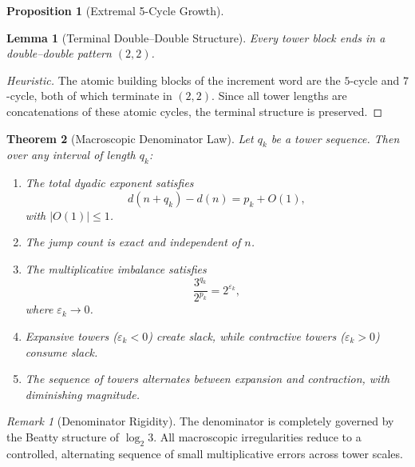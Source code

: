 \documentclass[12pt, oneside]{article}
\numberwithin{equation}{section}
\theoremstyle{definition}
\newtheorem{proposition}{Proposition}[section]
\theoremstyle{plain}
\newtheorem{theorem}{Theorem}[section]
\newtheorem{lemma}[theorem]{Lemma}
\theoremstyle{remark}
\newtheorem*{remark}{Remark}
\begin{document}
\begin{proposition}[Extremal 5-Cycle Growth]

\begin{lemma}[Terminal Double--Double Structure]
\label{lem:dd-terminal}
Every tower block ends in a double--double pattern $(2,2)$.
\end{lemma}

\begin{proof}[Heuristic]
The atomic building blocks of the increment word are the $5$-cycle and
$7$-cycle, both of which terminate in $(2,2)$.  Since all tower lengths
are concatenations of these atomic cycles, the terminal structure is
preserved.
\end{proof}


\begin{theorem}[Macroscopic Denominator Law]
\label{thm:denominator-law}
Let $q_k$ be a tower sequence.  Then over any interval of length $q_k$:
\begin{enumerate}
\item The total dyadic exponent satisfies
\[
d(n+q_k)-d(n) = p_k + O(1),
\]
with $|O(1)| \le 1$.

\item The jump count is exact and independent of $n$.

\item The multiplicative imbalance satisfies
\[
\frac{3^{q_k}}{2^{p_k}} = 2^{\varepsilon_k},
\]
where $\varepsilon_k \to 0$.

\item Expansive towers ($\varepsilon_k<0$) create slack, while
contractive towers ($\varepsilon_k>0$) consume slack.

\item The sequence of towers alternates between expansion and contraction,
with diminishing magnitude.
\end{enumerate}
\end{theorem}


\begin{remark}[Denominator Rigidity]
The denominator is completely governed by the Beatty structure of
$\log_2 3$.  All macroscopic irregularities reduce to a controlled,
alternating sequence of small multiplicative errors across tower scales.
\end{remark}



\end{proposition}
\end{document}
